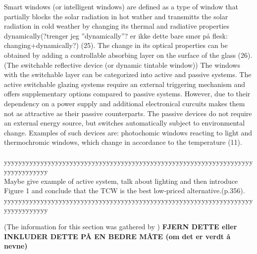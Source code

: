 Smart windows (or intelligent windows) are defined as a type of window that partially blocks the
solar radiation in hot wather and transmitts the solar radiation in cold weather by changing its
thermal and radiative properties dynamically(?trenger jeg ''dynamically''? er ikke dette bare
smør på flesk: changing+dynamically?) (25). The change in its optical properties can be
obtained by adding a controllable absorbing layer on the surface of the glass (26).
(The switchable reflective device (or dynamic tintable window)) The windows with the 
switchable layer can be categorized into active and passive systems. The active switchable glazing 
systems require an external triggering mechanism and offers supplementary options compared to 
passive systems. However, due to their dependency on a power supply and additional 
electronical curcuits makes them not as attractive as their passive counterparts.  
The passive devices do not require an external energy source, but switches automatically
subject to environmental change. Examples of such devices are: photochomic windows reacting to 
light and thermochromic windows, which change in accordance to the temperature (11).\\
\\
yyyyyyyyyyyyyyyyyyyyyyyyyyyyyyyyyyyyyyyyyyyyyyyyyyyyyyyyyyyyyyyyyyyyyyyyyyyyyyyy\\
Maybe give example of active system, talk about lighting and then introduce Figure 1 and 
conclude that the TCW is the best low-priced alternative.(p.356).\\
yyyyyyyyyyyyyyyyyyyyyyyyyyyyyyyyyyyyyyyyyyyyyyyyyyyyyyyyyyyyyyyyyyyyyyyyyyyyyyyy


(The information for this section was gathered by \cite{Kamalisarvestani2013}) \textbf{FJERN DETTE eller 
INKLUDER DETTE PÅ EN BEDRE MÅTE (om det er verdt å nevne) }

